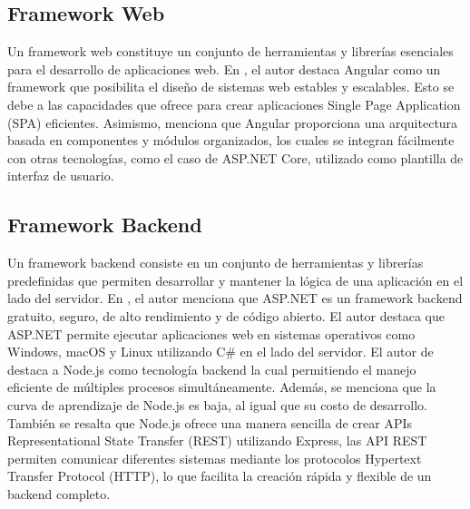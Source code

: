 \subsection{Framework Web}
Un framework web constituye un conjunto de herramientas y librerías esenciales para el desarrollo de aplicaciones web.
En \cite{chicaizavillegasAplicacionWebPara2023}, el autor destaca Angular como un framework que posibilita el diseño
de sistemas web estables y escalables. Esto se debe a las capacidades que ofrece para crear aplicaciones Single Page Application (SPA) eficientes.
Asimismo, menciona que Angular proporciona una arquitectura basada en componentes y módulos organizados, los cuales se
integran fácilmente con otras tecnologías, como el caso de ASP.NET Core, utilizado como plantilla de interfaz de usuario.

\subsection{Framework Backend}
Un framework backend consiste en un conjunto de herramientas y librerías predefinidas que permiten desarrollar y mantener
la lógica de una aplicación en el lado del servidor. En \cite{chicaizavillegasAplicacionWebPara2023}, el autor menciona
que ASP.NET es un framework backend gratuito, seguro, de alto rendimiento y de código abierto. El autor destaca que ASP.NET
permite ejecutar aplicaciones web en sistemas operativos como Windows, macOS y Linux utilizando C\# en el lado del servidor.
\bigbreak
El autor de \cite{chasichangoAplicacionMovilApoyo2022} destaca a Node.js como tecnología backend  la cual permitiendo el
manejo eficiente de múltiples procesos simultáneamente. Además, se menciona que la curva de aprendizaje de Node.js es
baja, al igual que su costo de desarrollo. También se resalta que Node.js ofrece una manera sencilla de crear APIs Representational State Transfer (REST)
utilizando Express, las API REST permiten comunicar diferentes sistemas mediante los protocolos Hypertext Transfer Protocol (HTTP), lo que facilita
la creación rápida y flexible de un backend completo.

